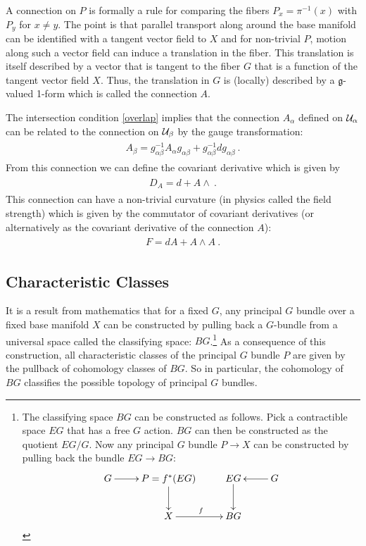 \documentclass[11pt]{article}
\newcommand{\eq}[1]{\begin{align}\begin{split}#1\end{split}\end{align}}
\def\CU {{\cal U}}
\def\fg{\mathfrak{g}}
\begin{document}
A connection on $P$ is formally a rule for comparing the fibers $P_x=\pi^{-1}(x)$ with $P_y$ for $x\neq y$. The point is that parallel transport along around the base manifold can be identified with a tangent vector field to $X$ and for non-trivial $P$, motion along such a vector field can induce a translation in the fiber. This translation is itself described by a vector that is tangent to the fiber $G$  that is a function of the tangent vector field $X$. Thus, the translation in $G$ is (locally) described by a $\fg$-valued 1-form which is called the connection $A$. 

The intersection condition \eqref{overlap}  implies that the connection $A_\alpha$ defined on $\CU_\alpha$ can be related to the connection on $\CU_\beta$ by the gauge transformation:
\eq{
A_\beta=g_{\alpha\beta}^{-1}A_\alpha g_{\alpha\beta}+g_{\alpha\beta}^{-1}dg_{\alpha\beta}~.
} 
From this connection we can define the covariant derivative which is given by 
\eq{
D_A=d+A\wedge ~.
}
This connection can have a non-trivial curvature (in physics called the field strength) which is given by the commutator of covariant derivatives (or alternatively as the covariant derivative of the connection $A$):
\eq{
F=dA+A\wedge A~.
}
 

\subsection{Characteristic Classes}

It is a result from mathematics that for a fixed $G$, any principal $G$ bundle over a fixed base manifold $X$ can be constructed by pulling back a $G$-bundle from a universal space called the classifying space: $BG$.\footnote{
The classifying space $BG$ can be constructed as follows. Pick a contractible space $EG$ that has a free $G$ action. $BG$ can then be constructed as the quotient $EG/G$. Now any principal $G$ bundle  $P\to X$ can be constructed by pulling back the bundle $EG\to BG$: 
\eq{
\xymatrix{
G\ar[r]& P=f^\ast(EG)\ar[d]& EG\ar[d]& G\ar[l]\\
&X\ar[r]^f&BG&
}
}}
As a consequence of this construction, all characteristic classes of the principal $G$ bundle $P$ are given by the pullback of cohomology classes of $BG$. So in particular, the cohomology of $BG$ classifies the possible topology of principal $G$ bundles. 
\end{document}
